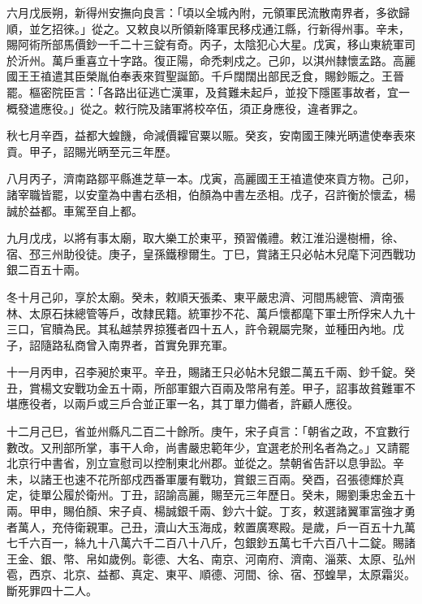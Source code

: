 \begin{pinyinscope}
 六月戊辰朔，新得州安撫向良言：「頃以全城內附，元領軍民流散南界者，多欲歸順，並乞招徠。」從之。又敕良以所領新降軍民移戍通江縣，行新得州事。辛未，賜阿術所部馬價鈔一千二十三錠有奇。丙子，太陰犯心大星。戊寅，移山東統軍司於沂州。萬戶重喜立十字路。復正陽，命禿剌戍之。己卯，以淇州隸懷孟路。高麗國王王禃遣其臣榮胤伯奉表來賀聖誕節。千戶闊闊出部民乏食，賜鈔賑之。王晉罷。樞密院臣言：「各路出征逃亡漢軍，及貧難未起戶，並投下隱匿事故者，宜一概發遣應役。」從之。敕行院及諸軍將校卒伍，須正身應役，違者罪之。



 秋七月辛酉，益都大蝗饑，命減價糶官粟以賑。癸亥，安南國王陳光昞遣使奉表來貢。甲子，詔賜光昞至元三年歷。



 八月丙子，濟南路鄒平縣進芝草一本。戊寅，高麗國王王禃遣使來貢方物。己卯，諸宰職皆罷，以安童為中書右丞相，伯顏為中書左丞相。戊子，召許衡於懷孟，楊誠於益都。車駕至自上都。



 九月戊戌，以將有事太廟，取大樂工於東平，預習儀禮。敕江淮沿邊樹柵，徐、宿、邳三州助役徒。庚子，皇孫鐵穆爾生。丁巳，賞諸王只必帖木兒麾下河西戰功銀二百五十兩。



 冬十月己卯，享於太廟。癸未，敕順天張柔、東平嚴忠濟、河間馬總管、濟南張林、太原石抹總管等戶，改隸民籍。統軍抄不花、萬戶懷都麾下軍士所俘宋人九十三口，官贖為民。其私越禁界掠獲者四十五人，許令親屬完聚，並種田內地。戊子，詔隨路私商曾入南界者，首實免罪充軍。



 十一月丙申，召李昶於東平。辛丑，賜諸王只必帖木兒銀二萬五千兩、鈔千錠。癸丑，賞楊文安戰功金五十兩，所部軍銀六百兩及幣帛有差。甲子，詔事故貧難軍不堪應役者，以兩戶或三戶合並正軍一名，其丁單力備者，許顧人應役。



 十二月己巳，省並州縣凡二百二十餘所。庚午，宋子貞言：「朝省之政，不宜數行數改。又刑部所掌，事干人命，尚書嚴忠範年少，宜選老於刑名者為之。」又請罷北京行中書省，別立宣慰司以控制東北州郡。並從之。禁朝省告訐以息爭訟。辛未，以諸王也速不花所部戍西番軍屢有戰功，賞銀三百兩。癸酉，召張德輝於真定，徒單公履於衛州。丁丑，詔諭高麗，賜至元三年歷日。癸未，賜劉秉忠金五十兩。甲申，賜伯顏、宋子貞、楊誠銀千兩、鈔六十錠。丁亥，敕選諸翼軍富強才勇者萬人，充侍衛親軍。己丑，瀆山大玉海成，敕置廣寒殿。是歲，戶一百五十九萬七千六百一，絲九十八萬六千二百八十八斤，包銀鈔五萬七千六百八十二錠。賜諸王金、銀、幣、帛如歲例。彰德、大名、南京、河南府、濟南、淄萊、太原、弘州雹，西京、北京、益都、真定、東平、順德、河間、徐、宿、邳蝗旱，太原霜災。斷死罪四十二人。




\end{pinyinscope}
